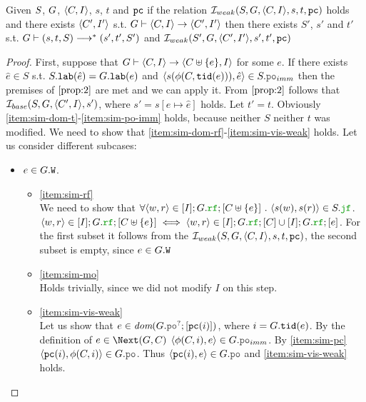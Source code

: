 \documentclass[12pt]{article}
\begin{document}
\begin{lemma}
  Given $S$, $G$, $\langle C, I \rangle$, $s$, $t$ and ${\mathtt{pc}}$
  if the relation $\mathcal{I}_{weak}(S, G, \langle C, I \rangle, s, t, {\mathtt{pc}})$ holds and 
  there exists $\langle C', I' \rangle$
  s.t. $G \vdash \langle C, I \rangle \rightarrow \langle C', I' \rangle$
  then there exists $S'$, $s'$ and $t'$ s.t. $G \vdash (s, t, S) \longrightarrow^* (s', t', S')$
  and $\mathcal{I}_{weak}(S', G, \langle C', I' \rangle, s', t', {\mathtt{pc}})$ 
\end{lemma}

\begin{proof}
  First, suppose that 
  $G \vdash \langle C, I \rangle \rightarrow \langle C \uplus \{e\}, I \rangle$ for some $e$.
  If there exists $\hat{e} \in S$ s.t. $S.{\mathtt{lab}}(\hat{e}) = G.{\mathtt{lab}}(e)$ and 
  $\tup{s(\front(C, \lTID(e))), \hat{e}} \in S.\lPO_{imm}$
  then the premises of $\ref{prop:2}$ are met and we can apply it.
  From $\ref{prop:2}$ follows that $\mathcal{I}_{base}(S, G, \langle C', I \rangle, s')$,
  where $s' = s[e \mapsto \hat{e}]$ holds.
  Let $t' = t$. Obviously \ref{item:sim-dom-t}-\ref{item:sim-po-imm} holds,
  because neither $S$ neither $t$ was modified. 
  We need to show that \ref{item:sim-dom-rf}-\ref{item:sim-vis-weak} holds.
  Let us consider different subcases:
  \begin{itemize}
  \item $e \in G.{\mathtt{W}}$.
    \begin{itemize}

    \item \ref{item:sim-rf} \\
      We need to show that
      $\forall{\tup{w, r} \in [\lI];\lG.\lRF;[\lC \uplus\{e\}]} ~.~
      \tup{s(w), s(r)} \in \lES.\lJF
      $.
      $\tup{w, r} \in [\lI];\lG.\lRF;[\lC \uplus\{e\}] \iff
      \tup{w, r} \in [\lI];\lG.\lRF;[\lC] \cup  [\lI];\lG.\lRF;[e]
      $.
      For the first subset it follows from the $\mathcal{I}_{weak}(S, G, \langle C, I \rangle, s, t, {\mathtt{pc}})$,
      the second subset is empty, since $e \in G.{\mathtt{W}}$
      
    \item \ref{item:sim-mo} \\
      Holds trivially, since we did not modify $I$ on this step.

    \item \ref{item:sim-vis-weak} \\
      Let us show that $e \in \dom{G.\lPO^?;[\lPC(i)]}$, where $i = G.{\mathtt{tid}}(e)$.
      By the definition of $e \in \Next(G, C)$ $\tup{\front(C, i), e} \in G.\lPO_{imm}$.
      By \ref{item:sim-pc} $\tup{\lPC(i), \front(C, i)} \in G.\lPO$.
      Thus $\tup{\lPC(i), e} \in G.\lPO$ and \ref{item:sim-vis-weak} holds.
    \end{itemize}
  \end{itemize}
  

\end{proof}
\end{document}

